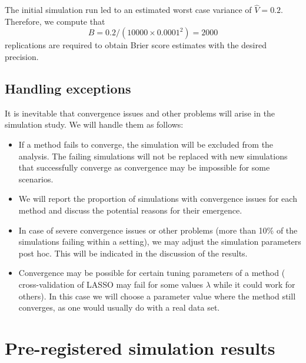 \begin{subappendices}
The initial simulation run led to an estimated worst case variance of
$\widehat{V} = 0.2$. Therefore, we compute that
$$B = 0.2/(10000 \times 0.0001^{2}) = 2000$$
replications are required to obtain Brier score estimates with the
desired precision.

\subsection{Handling exceptions} \label{sec6:exceptions}

It is inevitable that convergence issues and other problems will arise in the
simulation study. We will handle them as follows:
\begin{itemize}
  \item If a method fails to converge, the simulation will be excluded from the
        analysis. The failing simulations will not be replaced with new
        simulations that successfully converge as convergence may be impossible
        for some scenarios.
  \item We will report the proportion of simulations with convergence issues for
        each method and discuss the potential reasons for their emergence.
  \item In case of severe convergence issues or other problems (more than 10\%
        of the simulations failing within a setting), we may adjust the
        simulation parameters post hoc. This will be indicated in the discussion
        of the results.
  \item Convergence may be possible for certain tuning parameters of a method
        (\eg{} cross-validation of LASSO may fail for some values $\lambda$
        while it could work for others). In this case we will choose a parameter
        value where the method still converges, as one would usually do with a
        real data set.
\end{itemize}

\section{Pre-registered simulation results}


\end{subappendices}
